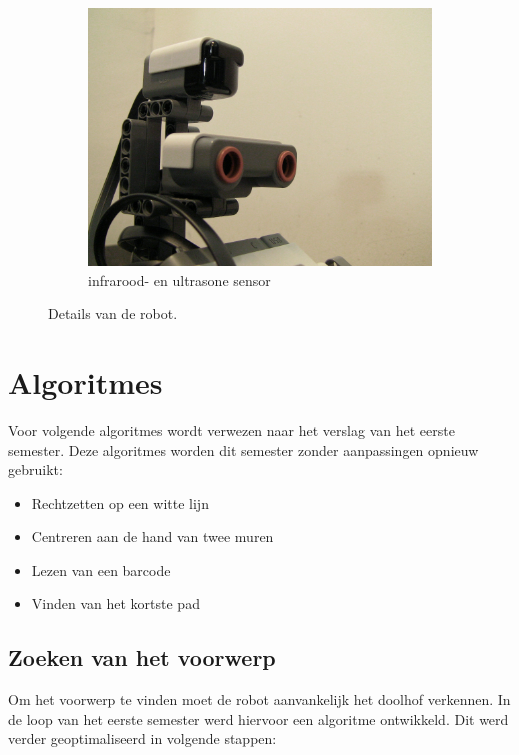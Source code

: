 \documentclass[tt2]{penoverslag}
\begin{document}
\begin{figure}
\begin{subfigure}[h]{0.325\textwidth}
		\includegraphics[width=\textwidth]{robotSensoren}
		\caption{infrarood- en ultrasone sensor}
	\end{subfigure}
\caption{Details van de robot.}
\label{fig:robotDetail}
\end{figure}


\section{Algoritmes}
\label{sec:Algo}
Voor volgende algoritmes wordt verwezen naar het verslag van het eerste semester. Deze algoritmes worden dit semester zonder aanpassingen opnieuw gebruikt:
\begin{itemize}
	\item Rechtzetten op een witte lijn
	\item Centreren aan de hand van twee muren
	\item Lezen van een barcode
	\item Vinden van het kortste pad
\end{itemize}

\subsection{Zoeken van het voorwerp} %
\label{ssec:AlgoZoek}
Om het voorwerp te vinden moet de robot aanvankelijk het doolhof verkennen. In de loop van het eerste semester werd hiervoor een algoritme ontwikkeld. Dit werd verder geoptimaliseerd in volgende stappen: 
\end{document}
